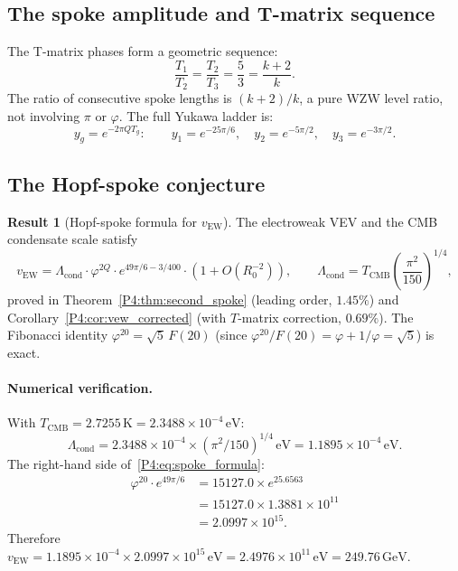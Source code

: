 \documentclass[11pt,a4paper]{article}
\theoremstyle{definition}
\newtheorem{result}[theorem]{Result}
\theoremstyle{remark}
\newcommand{\vp}{\varphi}
\newcommand{\TCMB}{T_{\mathrm{CMB}}}
\newcommand{\vEW}{v_{\mathrm{EW}}}
\newcommand{\Lcond}{\Lambda_{\mathrm{cond}}}
\begin{document}
\subsection{The spoke amplitude and T-matrix sequence}

The T-matrix phases form a geometric sequence:
\[
  \frac{T_1}{T_2} = \frac{T_2}{T_3} = \frac{5}{3} = \frac{k+2}{k}.
\]
The ratio of consecutive spoke lengths is $(k+2)/k$, a pure WZW
level ratio, not involving $\pi$ or $\vp$.  The full Yukawa ladder is:
\[
  y_g = e^{-2\pi Q T_g}:
  \qquad
  y_1 = e^{-25\pi/6},\quad
  y_2 = e^{-5\pi/2},\quad
  y_3 = e^{-3\pi/2}.
\]

\subsection{The Hopf-spoke conjecture}

\begin{result}[Hopf-spoke formula for $\vEW$]
\label{P4:conj:spoke}
The electroweak VEV and the CMB condensate scale satisfy
\begin{equation}
  \vEW
  = \Lcond\cdot\vp^{2Q}\cdot e^{49\pi/6 - 3/400}\cdot(1+O(R_0^{-2})),
  \qquad
  \Lcond = \TCMB\!\left(\frac{\pi^2}{150}\right)^{\!1/4},
  \label{P4:eq:spoke_formula}
\end{equation}
proved in Theorem~\ref{P4:thm:second_spoke} (leading order, $1.45\%$) and
Corollary~\ref{P4:cor:vew_corrected} (with $T$-matrix correction, $0.69\%$).
The Fibonacci identity $\vp^{20} = \sqrt{5}\,F(20)$ (since
$\vp^{20}/F(20) = \vp + 1/\vp = \sqrt{5}$) is exact.
\end{result}

\paragraph{Numerical verification.}
With $\TCMB = 2.7255\,\mathrm{K} = 2.3488\times10^{-4}\,\mathrm{eV}$:
\[
  \Lcond = 2.3488\times10^{-4}\times(\pi^2/150)^{1/4}\,\mathrm{eV}
         = 1.1895\times10^{-4}\,\mathrm{eV}.
\]
The right-hand side of~\eqref{P4:eq:spoke_formula}:
\begin{align*}
  \vp^{20}\cdot e^{49\pi/6}
  &= 15127.0\times e^{25.6563}\\
  &= 15127.0\times1.3881\times10^{11}\\
  &= 2.0997\times10^{15}.
\end{align*}
Therefore $\vEW = 1.1895\times10^{-4}\times2.0997\times10^{15}\,\mathrm{eV}
= 2.4976\times10^{11}\,\mathrm{eV} = 249.76\,\mathrm{GeV}$.
\end{document}
